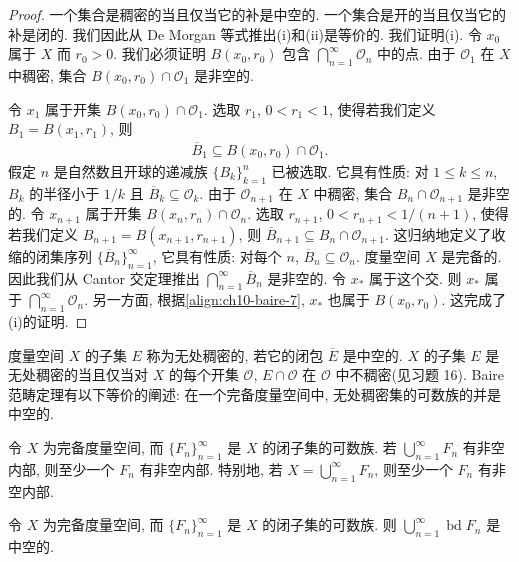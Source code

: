 \documentclass[../../main.tex]{subfiles}
\begin{document}
\begin{proof}
一个集合是稠密的当且仅当它的补是中空的. 一个集合是开的当且仅当它的补是闭的. 我们因此从 De Morgan 等式推出(i)和(ii)是等价的. 我们证明(i). 令 $x_{0}$ 属于 $X$ 而 $r_{0}>0$. 我们必须证明 $B(x_{0},r_{0})$ 包含 $\bigcap_{n=1}^{\infty}\mathcal{O}_{n}$ 中的点. 由于 $\mathcal{O}_{1}$ 在 $X$ 中稠密, 集合 $B(x_{0},r_{0})\cap\mathcal{O}_{1}$ 是非空的.

令 $x_{1}$ 属于开集 $B(x_{0},r_{0})\cap\mathcal{O}_{1}$. 选取 $r_{1}$, $0<r_{1}<1$, 使得若我们定义 $B_{1}=B(x_{1},r_{1})$, 则
\begin{align}
\overline{B}_{1}\subseteq B(x_{0},r_{0})\cap\mathcal{O}_{1}.\label{align:ch10-baire-7}
\end{align}
假定 $n$ 是自然数且开球的递减族 $\{B_{k}\}_{k=1}^{n}$ 已被选取. 它具有性质: 对 $1\leqslant k\leqslant n$, $B_{k}$ 的半径小于 $1/k$ 且 $\overline{B}_{k}\subseteq\mathcal{O}_{k}$. 由于 $\mathcal{O}_{n+1}$ 在 $X$ 中稠密, 集合 $B_{n}\cap\mathcal{O}_{n+1}$ 是非空的. 令 $x_{n+1}$ 属于开集 $B(x_{n},r_{n})\cap\mathcal{O}_{n}$. 选取 $r_{n+1}$, $0<r_{n+1}<1/(n+1)$, 使得若我们定义 $B_{n+1}=B(x_{n+1},r_{n+1})$, 则 $\overline{B}_{n+1}\subseteq B_{n}\cap\mathcal{O}_{n+1}$. 这归纳地定义了收缩的闭集序列 $\{\overline{B}_{n}\}_{n=1}^{\infty}$, 它具有性质: 对每个 $n$, $\overline{B}_{n}\subseteq\mathcal{O}_{n}$. 度量空间 $X$ 是完备的. 因此我们从 Cantor 交定理推出 $\bigcap_{n=1}^{\infty}\overline{B}_{n}$ 是非空的. 令 $x_{\ast}$ 属于这个交. 则 $x_{\ast}$ 属于 $\bigcap_{n=1}^{\infty}\mathcal{O}_{n}$. 另一方面, 根据\eqref{align:ch10-baire-7}, $x_{\ast}$ 也属于 $B(x_{0},r_{0})$. 这完成了(i)的证明.
\end{proof}

度量空间 $X$ 的子集 $E$ 称为无处稠密的, 若它的闭包 $\overline{E}$ 是中空的. $X$ 的子集 $E$ 是无处稠密的当且仅当对 $X$ 的每个开集 $\mathcal{O}$, $E\cap\mathcal{O}$ 在 $\mathcal{O}$ 中不稠密(见习题 16). Baire 范畴定理有以下等价的阐述: 在一个完备度量空间中, 无处稠密集的可数族的并是中空的.

\begin{corollary}\label{corollary:ch10-baire推论4}
令 $X$ 为完备度量空间, 而 $\{F_{n}\}_{n=1}^{\infty}$ 是 $X$ 的闭子集的可数族. 若 $\bigcup_{n=1}^{\infty}F_{n}$ 有非空内部, 则至少一个 $F_{n}$ 有非空内部. 特别地, 若 $X=\bigcup_{n=1}^{\infty}F_{n}$, 则至少一个 $F_{n}$ 有非空内部.
\end{corollary}

\begin{corollary}\label{corollary:ch10-baire推论5}
令 $X$ 为完备度量空间, 而 $\{F_{n}\}_{n=1}^{\infty}$ 是 $X$ 的闭子集的可数族. 则 $\bigcup_{n=1}^{\infty}\operatorname{bd}F_{n}$ 是中空的.
\end{corollary}
\end{document}

